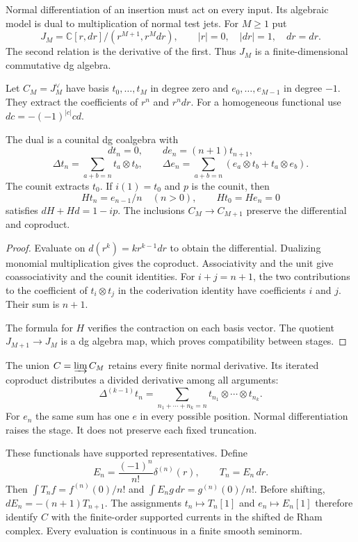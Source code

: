 Normal differentiation of an insertion must act on every
input. Its algebraic model is dual to multiplication of
normal test jets. For $M\geq1$ put
\[
 J_M=\mathbb C[r,dr]/(r^{M+1},r^Mdr),\qquad
 |r|=0,\quad |dr|=1,\quad d r=dr.
\]
The second relation is the derivative of the first.
Thus $J_M$ is a finite-dimensional commutative dg algebra.

Let $C_M=J_M^\vee$ have basis $t_0,\ldots,t_M$ in degree
zero and $e_0,\ldots,e_{M-1}$ in degree $-1$.
They extract the coefficients of $r^n$ and $r^n dr$.
For a homogeneous functional use $dc=-(-1)^{|c|}c d$.

\begin{proposition}\label{mht:prop:real-normal-coalgebra}
The dual is a counital dg coalgebra with
\[
 dt_n=0,\qquad de_n=(n+1)t_{n+1},
\]
\[
 \Delta t_n=\sum_{a+b=n}t_a\otimes t_b,\qquad
 \Delta e_n=\sum_{a+b=n}(e_a\otimes t_b+t_a\otimes e_b).
\]
The counit extracts $t_0$. If $i(1)=t_0$ and $p$ is the
counit, then
\[
 Ht_n=e_{n-1}/n\quad(n>0),\qquad Ht_0=He_n=0
\]
satisfies $dH+Hd=1-ip$. The inclusions $C_M\to C_{M+1}$
preserve the differential and coproduct.
\end{proposition}
\begin{proof}
Evaluate on $d(r^k)=kr^{k-1}dr$ to obtain the differential.
Dualizing monomial multiplication gives the coproduct.
Associativity and the unit give coassociativity and the
counit identities. For $i+j=n+1$, the two contributions
to the coefficient of $t_i\otimes t_j$ in the coderivation
identity have coefficients $i$ and $j$. Their sum is $n+1$.

The formula for $H$ verifies the contraction on each basis
vector. The quotient $J_{M+1}\to J_M$ is a dg algebra map,
which proves compatibility between stages.
\end{proof}

The union $C=\varinjlim C_M$ retains every finite normal
derivative. Its iterated coproduct distributes a divided
derivative among all arguments:
\[
 \Delta^{(k-1)}t_n
   =\sum_{n_1+\cdots+n_k=n}t_{n_1}\otimes\cdots\otimes t_{n_k}.
\]
For $e_n$ the same sum has one $e$ in every possible position.
Normal differentiation raises the stage. It does not preserve
each fixed truncation.

These functionals have supported representatives. Define
\[
 E_n=\frac{(-1)^n}{n!}\delta^{(n)}(r),\qquad T_n=E_n\,dr.
\]
Then $\int T_n f=f^{(n)}(0)/n!$ and
$\int E_n g\,dr=g^{(n)}(0)/n!$.
Before shifting, $dE_n=-(n+1)T_{n+1}$.
The assignments $t_n\mapsto T_n[1]$ and $e_n\mapsto E_n[1]$
therefore identify $C$ with the finite-order supported
currents in the shifted de Rham complex.
Every evaluation is continuous in a finite smooth seminorm.

